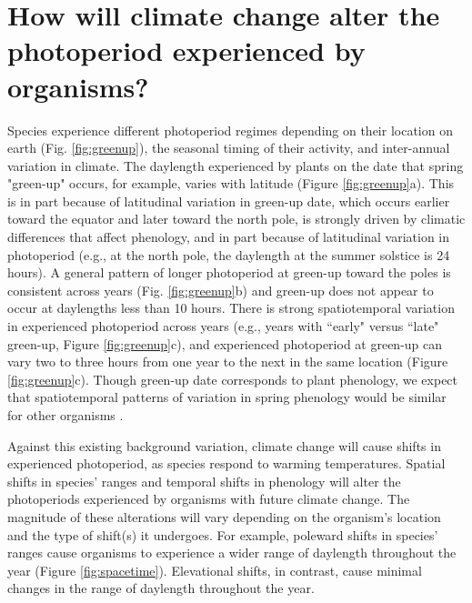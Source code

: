 \documentclass{article}
\begin{document}
\section*{How will climate change alter the photoperiod experienced by organisms?}
\par Species experience different photoperiod regimes depending on their location on earth (Fig. \ref{fig:greenup}), the seasonal timing of their activity, and inter-annual variation in climate. The daylength experienced by plants on the date that spring "green-up" occurs, for example, varies with latitude (Figure \ref{fig:greenup}a). This is in part because of latitudinal variation in green-up date, which occurs earlier toward the equator and later toward the north pole, is strongly driven by climatic differences that affect phenology, and in part because of latitudinal variation in photoperiod (e.g., at the north pole, the daylength at the summer solstice is 24 hours). A general pattern of longer photoperiod at green-up toward the poles is consistent across years (Fig. \ref{fig:greenup}b) and green-up does not appear to occur at daylengths less than 10 hours. %
There is strong spatiotemporal variation in experienced photoperiod across years (e.g., years with ``early" versus ``late" green-up, Figure \ref{fig:greenup}c), and  experienced photoperiod at green-up can vary two to three hours from one year to the next in the same location (Figure \ref{fig:greenup}c). Though green-up date corresponds to plant phenology, we expect that spatiotemporal patterns of variation in spring phenology would be similar for other organisms \citep{ovaskainen2013, penuelas2002}.

\par Against this existing background variation, climate change will cause shifts in experienced photoperiod, as species respond to warming temperatures. Spatial shifts in species' ranges and temporal shifts in phenology will alter the photoperiods experienced by organisms with future climate change. The magnitude of these alterations will vary depending on the organism's location and the type of shift(s) it undergoes. For example, poleward shifts in species' ranges cause organisms to experience a wider range of daylength throughout the year (Figure \ref{fig:spacetime}). Elevational shifts, in contrast, cause minimal changes in the range of daylength throughout the year. %
\end{document}
